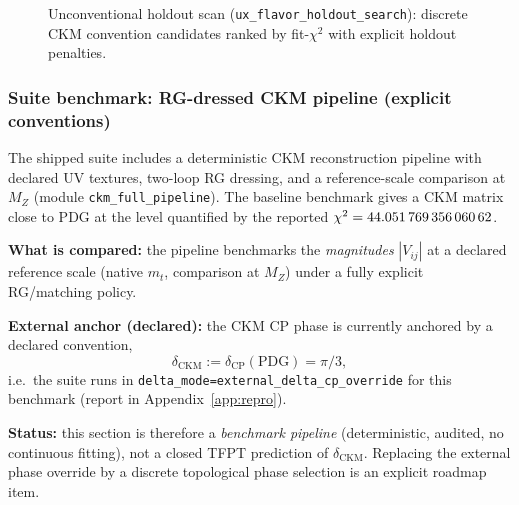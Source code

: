 \begin{figure}[H]
\centering
{}
\caption{Unconventional holdout scan (\texttt{ux\_flavor\_holdout\_search}): discrete CKM convention candidates ranked by fit-$\chi^2$ with explicit holdout penalties.}
\end{figure}

\subsubsection{Suite benchmark: RG-dressed CKM pipeline (explicit conventions)}
The shipped suite includes a deterministic CKM reconstruction pipeline with declared UV textures, two-loop RG dressing, and a reference-scale comparison at $M_Z$ (module \texttt{ckm\_full\_pipeline}). The baseline benchmark gives a CKM matrix close to PDG at the level quantified by the reported $\chi^2=\num{44.05176935606062}$.

\begin{tcolorbox}[colback=yellow!3, colframe=yellow!60!black, breakable,
title={\textbf{Benchmark hygiene: explicit external phase override (no hidden fit)}}, fonttitle=\bfseries\small]
\textbf{What is compared:} the pipeline benchmarks the \emph{magnitudes} $|V_{ij}|$ at a declared reference scale (native $m_t$, comparison at $M_Z$) under a fully explicit RG/matching policy.

\textbf{External anchor (declared):} the CKM CP phase is currently anchored by a declared convention,
\[
\delta_{\mathrm{CKM}} := \delta_{\mathrm{CP}}(\mathrm{PDG}) = \pi/3,
\]
i.e.\ the suite runs in \texttt{delta\_mode=external\_delta\_cp\_override} for this benchmark (report in Appendix~\ref{app:repro}).

\textbf{Status:} this section is therefore a \emph{benchmark pipeline} (deterministic, audited, no continuous fitting), not a closed TFPT prediction of $\delta_{\mathrm{CKM}}$. Replacing the external phase override by a discrete topological phase selection is an explicit roadmap item.
\end{tcolorbox}

